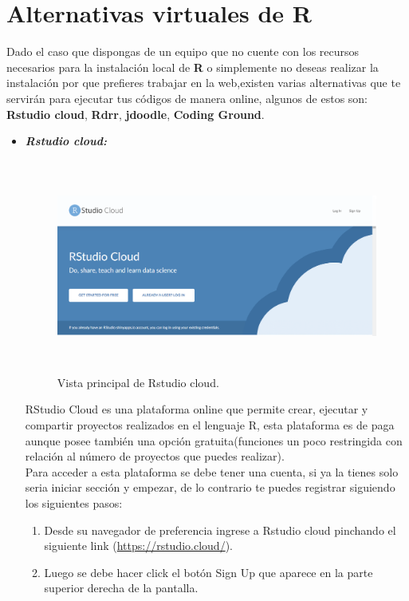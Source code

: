 \documentclass{article}
\begin{document}
\section{Alternativas virtuales  de R}
Dado el caso que dispongas de un equipo que no cuente con los recursos necesarios para la instalación local de \textbf{R} o  simplemente no deseas realizar la instalación por que prefieres trabajar en la web,existen varias alternativas que te servirán para ejecutar tus códigos de manera online, algunos de estos son: \textbf{Rstudio cloud}, \textbf{Rdrr}, \textbf { jdoodle}, \textbf{ Coding Ground}.

\begin{itemize}
\item \textbf{\textit{Rstudio cloud: }}
\begin{figure}[H]
\centering
\includegraphics[width=12cm,height=7cm]{imagenes/RstudioCloud.png}
\caption{\label{fig0:frog}Vista principal de Rstudio cloud.}
\end{figure}
RStudio Cloud es una plataforma online que permite crear, ejecutar y compartir proyectos realizados en el lenguaje R, esta plataforma es de paga aunque posee también una opción gratuita(funciones un poco restringida con relación al número de proyectos que puedes realizar).\\
Para acceder a esta plataforma se debe tener una cuenta, si ya la tienes solo seria iniciar sección y empezar, de lo contrario te puedes registrar siguiendo los siguientes pasos: 
\begin{enumerate}
    \item Desde su navegador de preferencia ingrese a Rstudio cloud pinchando el siguiente link (\url{https://rstudio.cloud/}).
    \item Luego se debe hacer click el botón Sign Up que aparece en la parte superior derecha de la pantalla.

\end{enumerate}
\end{itemize}
\end{document}
